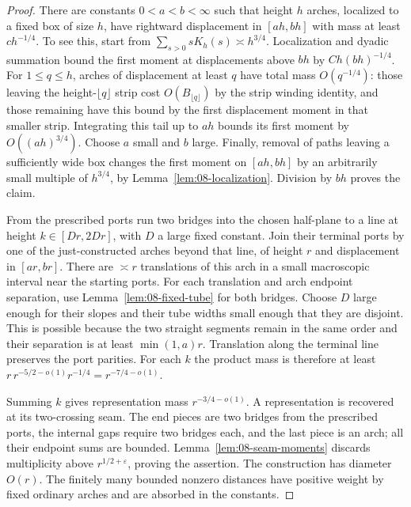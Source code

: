 \begin{proof}
There are constants \(0<a<b<\infty\) such that height \(h\) arches,
localized to a fixed box of size \(h\), have rightward displacement in
\([ah,bh]\) with mass at least \(ch^{-1/4}\). To see this, start from
\(\sum_{s>0}sK_h(s)\asymp h^{3/4}\). Localization and dyadic summation
bound the first moment at displacements above \(bh\) by
\(Ch(bh)^{-1/4}\). For \(1\le q\le h\), arches of displacement at
least \(q\) have total mass \(O(q^{-1/4})\): those leaving the
height-\(\lfloor q\rfloor\) strip cost \(O(B_{\lfloor q\rfloor})\)
by the strip winding identity, and those remaining have this bound by
the first displacement moment in that smaller strip. Integrating this
tail up to \(ah\) bounds its first moment by \(O((ah)^{3/4})\).
Choose \(a\) small and \(b\) large. Finally, removal of paths leaving a
sufficiently wide box changes the first moment on \([ah,bh]\) by an
arbitrarily small multiple of \(h^{3/4}\), by
Lemma~\ref{lem:08-localization}. Division by \(bh\) proves the claim.

From the prescribed ports run two bridges into the chosen half-plane to
a line at height \(k\in[Dr,2Dr]\), with \(D\) a large fixed constant.
Join their terminal ports by one of the just-constructed arches beyond
that line, of height \(r\) and displacement in \([ar,br]\).
There are \(\asymp r\) translations of this arch in a small macroscopic
interval near the starting ports. For each translation and arch endpoint
separation, use Lemma~\ref{lem:08-fixed-tube} for both bridges. Choose
\(D\) large enough for their slopes and their tube widths small enough
that they are disjoint. This is possible because the two straight segments
remain in the same order and their separation is at least
\(\min(1,a)r\). Translation along the terminal line preserves the port
parities. For each \(k\) the product mass is therefore at least
\(r\,r^{-5/2-o(1)}r^{-1/4}=r^{-7/4-o(1)}\).

Summing \(k\) gives representation mass \(r^{-3/4-o(1)}\). A
representation is recovered at its two-crossing seam. The end pieces are
two bridges from the prescribed ports, the internal gaps require two
bridges each, and the last piece is an arch; all their endpoint sums are
bounded. Lemma~\ref{lem:08-seam-moments} discards multiplicity above
\(r^{1/2+\varepsilon}\), proving the assertion. The construction has
diameter \(O(r)\). The finitely many bounded nonzero distances have
positive weight by fixed ordinary arches and are absorbed in the constants.
\end{proof}

